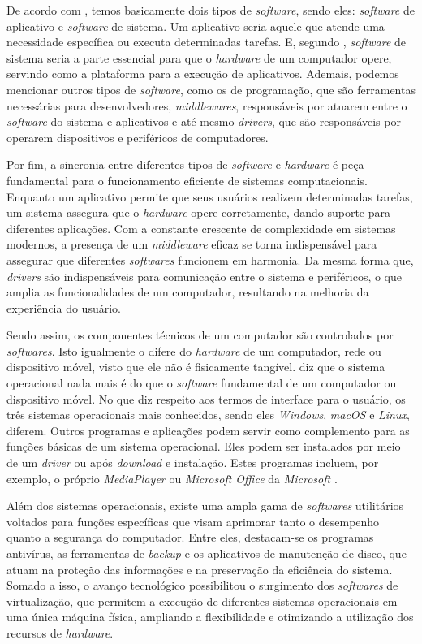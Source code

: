 \documentclass[english,brazilian]{UNISINOSartigo} %
\begin{document}
De acordo com , temos basicamente dois tipos de \textit{software}, sendo eles: \textit{software} de aplicativo e \textit{software} de sistema. Um aplicativo seria aquele que atende uma necessidade específica ou executa determinadas tarefas. E, segundo , \textit{software} de sistema seria a parte essencial para que o \textit{hardware} de um computador opere, servindo como a plataforma para a execução de aplicativos. Ademais, podemos mencionar outros tipos de \textit{software}, como os de programação, que são ferramentas necessárias para desenvolvedores, \textit{middlewares}, responsáveis por atuarem entre o \textit{software} do sistema e aplicativos e até mesmo \textit{drivers}, que são responsáveis por operarem dispositivos e periféricos de computadores.

Por fim, a sincronia entre diferentes tipos de \textit{software} e \textit{hardware} é peça fundamental para o funcionamento eficiente de sistemas computacionais. Enquanto um aplicativo permite que seus usuários realizem determinadas tarefas, um sistema assegura que o \textit{hardware} opere corretamente, dando suporte para diferentes aplicações. Com a constante crescente de complexidade em sistemas modernos, a presença de um \textit{middleware} eficaz se torna indispensável para assegurar que diferentes \textit{softwares} funcionem em harmonia. Da mesma forma que, \textit{drivers} são indispensáveis para comunicação entre o sistema e periféricos, o que amplia as funcionalidades de um computador, resultando na melhoria da experiência do usuário.

Sendo assim, os componentes técnicos de um computador são controlados por \textit{softwares}. Isto igualmente o difere do \textit{hardware} de um computador, rede ou dispositivo móvel, visto que ele não é fisicamente tangível.  diz que o sistema operacional nada mais é do que o \textit{software} fundamental de um computador ou dispositivo móvel. No que diz respeito aos termos de interface para o usuário, os três sistemas operacionais mais conhecidos, sendo eles \textit{Windows}, \textit{macOS} e \textit{Linux}, diferem. Outros programas e aplicações podem servir como complemento para as funções básicas de um sistema operacional. Eles podem ser instalados por meio de um \textit{driver} ou após \textit{download} e instalação. Estes programas incluem, por exemplo, o próprio \textit{MediaPlayer} ou \textit{Microsoft Office} da \textit{Microsoft} \cite{neto2019}.

Além dos sistemas operacionais, existe uma ampla gama de \textit{softwares} utilitários voltados para funções específicas que visam aprimorar tanto o desempenho quanto a segurança do computador. Entre eles, destacam-se os programas antivírus, as ferramentas de \textit{backup} e os aplicativos de manutenção de disco, que atuam na proteção das informações e na preservação da eficiência do sistema. Somado a isso, o avanço tecnológico possibilitou o surgimento dos \textit{softwares} de virtualização, que permitem a execução de diferentes sistemas operacionais em uma única máquina física, ampliando a flexibilidade e otimizando a utilização dos recursos de \textit{hardware}.
\end{document}
